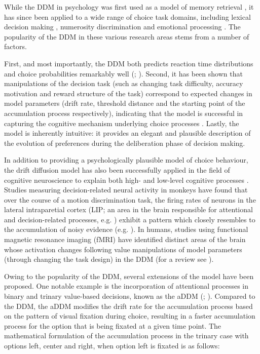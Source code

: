 \documentclass[11pt,a4paper]{article}
\begin{document}
While the DDM in psychology was first used as a model of memory retrieval \cite{Ratcliff1978b}, it has since been applied to a wide range of choice task domains, including lexical decision making \cite{Ratcliff2004}, numerosity discrimination \cite{Leite2011} and emotional processing \cite{Mueller2016}. The popularity of the DDM in these various research areas stems from a number of factors. 

First, and most importantly, the DDM both predicts reaction time distributions and choice probabilities remarkably well (; ). Second, it has been shown that manipulations of the decision task (such as changing task difficulty, accuracy motivation and reward structure of the task) correspond to expected changes in model parameters (drift rate, threshold distance and the starting point of the accumulation process respectively), indicating that the model is successful in capturing the cognitive mechanism underlying choice processes \cite{Voss2004a}. Lastly, the model is inherently intuitive: it provides an elegant and plausible description of the evolution of preferences during the deliberation phase of decision making.

In addition to providing a psychologically plausible model of choice behaviour, the drift diffusion model has also been successfully applied in the field of cognitive neuroscience to explain both high- and low-level cognitive processes \cite{Forstmann2016}. Studies measuring decision-related neural activity in monkeys have found that over the course of a motion discrimination task, the firing rates of neurons in the lateral intraparetial cortex (LIP; an area in the brain responsible for attentional and decision-related processes, e.g. ) exhibit a pattern which closely resembles to the accumulation of noisy evidence (e.g. ). In humans, studies using functional magnetic resonance imaging (fMRI) have identified distinct areas of the brain whose activation changes following value manipulations of model parameters (through changing the task design) in the DDM (for a review see ). 

Owing to the popularity of the DDM, several extensions of the model have been proposed. One notable example is the incorporation of attentional processes in binary and trinary value-based decisions, known as the aDDM (; ). Compared to the DDM, the aDDM modifies the drift rate for the accumulation process based on the pattern of visual fixation during choice, resulting in a faster accumulation process for the option that is being fixated at a given time point. The mathematical formulation of the accumulation process in the trinary case with options left, center and right, when option left is fixated is as follows:
\end{document}
